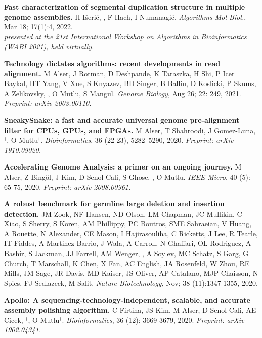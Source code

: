 \vspace{-.2cm}
{\bf Fast characterization of segmental duplication structure in multiple genome assemblies.}
H Išerić, \calkan{}, F Hach, I Numanagić.
{\it Algorithms Mol Biol.}, Mar 18; 17(1):4, 2022.\\
         \hspace*{1cm}
          {\footnotesize \em presented at the 21st International Workshop on Algorithms in Bioinformatics (WABI 2021), held virtually.}


\vspace{-.2cm}
{\bf Technology dictates algorithms: recent developments in read alignment.}
M Alser, J Rotman, D Deshpande, K Taraszka, H Shi, P Icer Baykal, HT Yang, V Xue, S Knyazev, BD Singer, B Balliu, D Koslicki, P Skums, A Zelikovsky, \calkan{}, O Mutlu, S Mangul.
{\it Genome Biology}, Aug 26; 22: 249, 2021.
\textit{Preprint: arXiv 2003.00110.}

\vspace{-.2cm}
{\bf SneakySnake: a fast and accurate universal genome pre-alignment filter for CPUs, GPUs, and FPGAs.} M Alser, T Shahroodi, J Gomez-Luna, \calkan{}$^\ddag$, O Mutlu$^\ddag$. {\it Bioinformatics}, 36 (22-23), 5282–5290, 2020. \textit {Preprint: arXiv 1910.09020.}

\vspace{-.2cm}
{\bf Accelerating Genome Analysis: a primer on an ongoing journey.} M Alser, Z Bingöl, J Kim, D Senol Cali, S Ghose, \calkan{}, O Mutlu. {\it IEEE Micro}, 40 (5): 65-75, 2020. \textit{Preprint: arXiv 2008.00961.}

\vspace{-.2cm}
 {\bf A robust benchmark for germline large deletion and insertion detection.}
 JM Zook, NF Hansen, ND Olson, LM Chapman, JC Mullikin, C Xiao, S Sherry, S Koren, AM Phillippy, PC Boutros, SME Sahraeian, V Huang, A Rouette, N Alexander, CE Mason, I Hajirasouliha, C Ricketts, J Lee, R Tearle, IT Fiddes, A Martinez-Barrio, J Wala, A Carroll, N Ghaffari, OL Rodriguez, A Bashir, S Jackman, JJ Farrell, AM Wenger, \calkan{}, A Soylev, MC Schatz, S Garg, G Church, T Marschall, K Chen, X Fan, AC English, JA Rosenfeld, W Zhou, RE Mills, JM Sage, JR Davis, MD Kaiser, JS Oliver, AP Catalano, MJP Chaisson, N Spies, FJ Sedlazeck, M Salit.
 {\it Nature Biotechnology}, Nov;  38 (11):1347-1355, 2020.
 
\clearpage

\vspace{-.2cm}
{\bf Apollo: A sequencing-technology-independent, scalable, and accurate assembly polishing algorithm.} C Firtina, JS Kim, M Alser, D Senol Cali, AE Cicek, \calkan{}$^\ddag$, O Mutlu$^\ddag$. {\it Bioinformatics}, 36 (12): 3669-3679, 2020.
\textit{Preprint: arXiv 1902.04341.}


